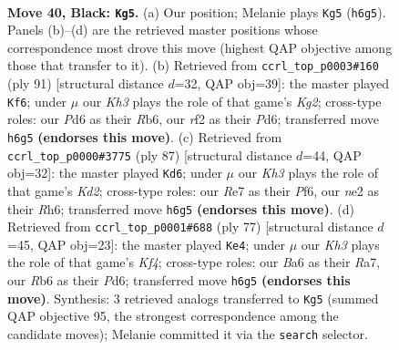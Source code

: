 \documentclass[11pt]{article}
\begin{document}
\clearpage

\begin{figure}[p]\centering
\begin{subfigure}{0.46\textwidth}\centering
\resizebox{\linewidth}{!}{%
\newchessgame
\chessboard[
  setfen={8/p3r3/br1p3k/2pB4/2P3P1/8/4NR1K/R7 b - - 0 40},
  showmover=false,
  pgfstyle=straightmove, color=movearrow, markmove={h6-g5}
]}
\caption{}
\end{subfigure}\hfill
\begin{subfigure}{0.46\textwidth}\centering
\resizebox{\linewidth}{!}{%
\newchessgame
\chessboard[
  setfen={8/R2br1k1/1r1p3p/2pB1P2/8/3P4/6P1/2R3K1 b - - 0 46},
  showmover=false,
  pgfstyle=straightmove, color=movearrow, markmove={g7-f6}
]}
\caption{}
\end{subfigure}
\\[4pt]
\begin{subfigure}{0.46\textwidth}\centering
\resizebox{\linewidth}{!}{%
\newchessgame
\chessboard[
  setfen={8/1b1k4/p4p1r/2RP4/4B1p1/8/PP2N2p/7K b - - 2 44},
  showmover=false,
  pgfstyle=straightmove, color=movearrow, markmove={d7-d6}
]}
\caption{}
\end{subfigure}\hfill
\begin{subfigure}{0.46\textwidth}\centering
\resizebox{\linewidth}{!}{%
\newchessgame
\chessboard[
  setfen={8/r1p5/P2p4/2pP1k1p/2P4b/8/R2B3P/5K2 b - - 2 39},
  showmover=false,
  pgfstyle=straightmove, color=movearrow, markmove={f5-e4}
]}
\caption{}
\end{subfigure}
\caption{\textbf{Move 40, Black: \texttt{Kg5}.} (a) Our position; Melanie plays \texttt{Kg5} (\texttt{h6g5}). Panels (b)--(d) are the retrieved master positions whose correspondence most drove this move (highest QAP objective among those that transfer to it). (b) Retrieved from \texttt{ccrl\_top\_p0003\#160} (ply 91) [structural distance $d$=32, QAP obj=39]: the master played \texttt{Kf6}; under $\mu$ our \emph{Kh3} plays the role of that game's \emph{Kg2}; cross-type roles: our \emph{P}d6 as their \emph{R}b6, our \emph{r}f2 as their \emph{P}d6; transferred move \texttt{h6g5} \textbf{(endorses this move)}. (c) Retrieved from \texttt{ccrl\_top\_p0000\#3775} (ply 87) [structural distance $d$=44, QAP obj=32]: the master played \texttt{Kd6}; under $\mu$ our \emph{Kh3} plays the role of that game's \emph{Kd2}; cross-type roles: our \emph{R}e7 as their \emph{P}f6, our \emph{n}e2 as their \emph{R}h6; transferred move \texttt{h6g5} \textbf{(endorses this move)}. (d) Retrieved from \texttt{ccrl\_top\_p0001\#688} (ply 77) [structural distance $d$=45, QAP obj=23]: the master played \texttt{Ke4}; under $\mu$ our \emph{Kh3} plays the role of that game's \emph{Kf4}; cross-type roles: our \emph{B}a6 as their \emph{R}a7, our \emph{R}b6 as their \emph{P}d6; transferred move \texttt{h6g5} \textbf{(endorses this move)}. Synthesis: 3 retrieved analogs transferred to \texttt{Kg5} (summed QAP objective 95, the strongest correspondence among the candidate moves); Melanie committed it via the \texttt{search} selector.}
\label{fig:thought-m79}
\end{figure}
\end{document}
